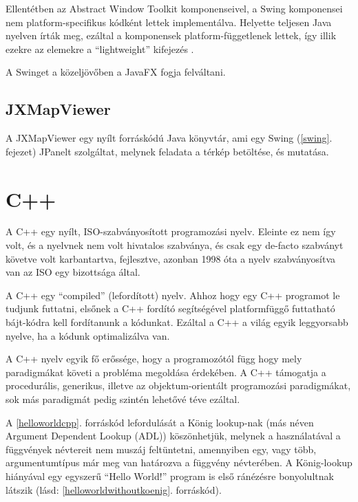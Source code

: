 \documentclass[a4paper,12pt]{report}
\begin{document}
\vspace{2mm}
Ellentétben az Abstract Window Toolkit komponenseivel, a Swing komponensei nem platform-specifikus kódként lettek implementálva. Helyette teljesen Java nyelven írták meg, ezáltal a komponensek platform-függetlenek lettek, így illik ezekre az elemekre a ``lightweight'' kifejezés \cite{swingarticle}.

\vspace{2mm}
A Swinget a közeljövőben a JavaFX \cite{javafx} fogja felváltani.

\subsection{JXMapViewer}
\label{jxmapviewer}

A JXMapViewer \cite{jxmapv} egy nyílt forráskódú Java könyvtár, ami egy Swing (\ref{swing}. fejezet) JPanelt \cite{jpanel} szolgáltat, melynek feladata a térkép betöltése, és mutatása.

\newpage
\section{C++}
\label{cplusplus}

A C++ egy nyílt, ISO-szabványosított programozási nyelv. Eleinte ez nem így volt, és a nyelvnek nem volt hivatalos szabványa, és csak egy de-facto szabványt követve volt karbantartva, fejlesztve, azonban 1998 óta \cite{c++98} a nyelv szabványosítva van az ISO egy bizottsága által.

\vspace{2mm}
A C++ egy ``compiled'' (lefordított) nyelv. Ahhoz hogy egy C++ programot le tudjunk futtatni, elsőnek a C++ fordító segítségével platformfüggő futtatható bájt-kódra kell fordítanunk a kódunkat. Ezáltal a C++ a világ egyik leggyorsabb nyelve, ha a kódunk optimalizálva van.

\vspace{2mm}
A C++ nyelv egyik fő erőssége, hogy a programozótól függ hogy mely paradigmákat követi a probléma megoldása érdekében. A C++ támogatja a procedurális, generikus, illetve az objektum-orientált programozási paradigmákat, sok más paradigmát pedig szintén lehetővé téve ezáltal.



A \ref{helloworldcpp}. forráskód lefordulását a König lookup-nak (más néven Argument Dependent Lookup (ADL)) köszönhetjük, melynek a használatával a függvények névtereit nem muszáj feltüntetni, amennyiben egy, vagy több, argumentumtípus már meg van határozva a függvény névterében. A König-lookup hiányával egy egyszerű ``Hello World!'' program is első ránézésre bonyolultnak látszik (lásd: \ref{helloworldwithoutkoenig}. forráskód).
\end{document}
